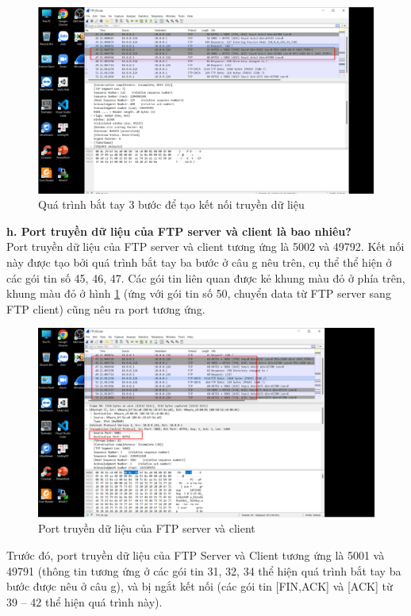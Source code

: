 \begin{figure}[H]
\begin{center}
\includegraphics[scale=.8]{../figures/p5/p5_7}
\end{center}
\caption{Quá trình bắt tay 3 bước để tạo kết nối truyền dữ liệu}
\end{figure}

\textbf{h.	Port truyền dữ liệu của FTP server và client là bao nhiêu?}\\
Port truyền dữ liệu của FTP server và client tương ứng là 5002 và 49792. Kết nối này được tạo bởi quá trình bắt tay ba bước ở câu g nêu trên, cụ thể thể hiện ở các gói tin số 45, 46, 47.
Các gói tin liên quan được kẻ khung màu đỏ ở phía trên, khung màu đỏ ở hình \ref{fig5h} (ứng với gói tin số 50, chuyển data từ FTP server sang FTP client) cũng nêu ra port tương ứng.

\begin{figure}[H]
\begin{center}
\includegraphics[scale=.8]{../figures/p5/p5_8}
\end{center}
\caption{Port truyền dữ liệu của FTP server và client}
\label{fig5h}
\end{figure}

Trước đó, port truyền dữ liệu của FTP Server và Client tương ứng là 5001 và 49791 (thông tin tương ứng ở các gói tin 31, 32, 34 thể hiện quá trình bắt tay ba bước được nêu ở câu g), và bị ngắt kết nối (các gói tin [FIN,ACK] và [ACK] từ 39 – 42 thể hiện quá trình này).
